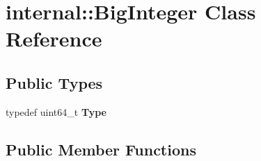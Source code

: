 \hypertarget{a02248}{}\section{internal\+:\+:Big\+Integer Class Reference}
\label{a02248}
\subsection*{Public Types}
\begin{DoxyCompactItemize}
\item 
\mbox{\label{a02248_a1310812fca26ebae77594ba08678fc4c}} 
typedef uint64\+\_\+t {\bfseries Type}
\end{DoxyCompactItemize}
\subsection*{Public Member Functions}
